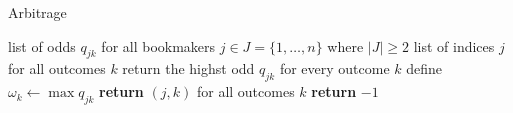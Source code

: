\documentclass[paper=a4]{scrreprt}
\begin{document}
\begin{algorithm}
\caption{Arbitrage}\label{alg:arbitrage}
\begin{algorithmic}[1]
\Require list of odds $q_{jk}$ for all bookmakers $j \in J=\{1,\dots,n\}$ where $ |J| \geq 2 $
\Ensure list of indices $j$ for all outcomes $k$
		return the highst odd $q_{jk}$ for every outcome $k$
	\EndFor
	\State define $\omega_k \gets \max{q_{jk}}$
\EndFor
{}
	\State \textbf{return} $(j,k)$ for all outcomes $k$
	\Else
		\State \textbf{return} $-1$
\EndIf
\EndProcedure
\end{algorithmic}


\end{algorithm}
\end{document}

